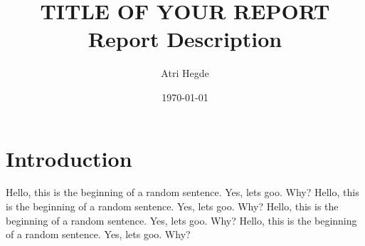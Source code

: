 \documentclass[a4paper,11pt]{article}
\author{Atri Hegde}
\date{\today}
\title{TITLE OF YOUR REPORT\\\medskip
\large Report Description}
\begin{document}
\maketitle
\tableofcontents

\newpage
\section{Introduction}
\label{sec:org1a36e1d}
Hello, this is the beginning of a random sentence. Yes, lets goo. Why?
Hello, this is the beginning of a random sentence. Yes, lets goo. Why?
Hello, this is the beginning of a random sentence. Yes, lets goo. Why?
Hello, this is the beginning of a random sentence. Yes, lets goo. Why?

\newpage
\printbibliography
\end{document}
